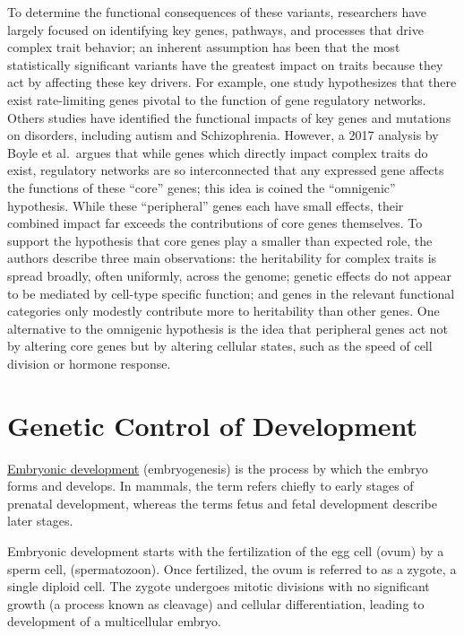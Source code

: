To determine the functional consequences of these variants, researchers have largely focused on identifying key genes, pathways, and processes that drive complex trait behavior; an inherent assumption has been that the most statistically significant variants have the greatest impact on traits because they act by affecting these key drivers. For example, one study hypothesizes that there exist rate-limiting genes pivotal to the function of gene regulatory networks. Others studies have identified the functional impacts of key genes and mutations on disorders, including autism and Schizophrenia. However, a 2017 analysis by Boyle et al.~argues that while genes which directly impact complex traits do exist, regulatory networks are so interconnected that any expressed gene affects the functions of these ``core'' genes; this idea is coined the ``omnigenic'' hypothesis. While these ``peripheral'' genes each have small effects, their combined impact far exceeds the contributions of core genes themselves. To support the hypothesis that core genes play a smaller than expected role, the authors describe three main observations: the heritability for complex traits is spread broadly, often uniformly, across the genome; genetic effects do not appear to be mediated by cell-type specific function; and genes in the relevant functional categories only modestly contribute more to heritability than other genes. One alternative to the omnigenic hypothesis is the idea that peripheral genes act not by altering core genes but by altering cellular states, such as the speed of cell division or hormone response.

\hypertarget{genetic-control-of-development}{%
\chapter{Genetic Control of Development}\label{genetic-control-of-development}}

\href{https://en.wikipedia.org/wiki/Embryonic_development}{Embryonic development} (embryogenesis) is the process by which the embryo forms and develops. In mammals, the term refers chiefly to early stages of prenatal development, whereas the terms fetus and fetal development describe later stages.

Embryonic development starts with the fertilization of the egg cell (ovum) by a sperm cell, (spermatozoon). Once fertilized, the ovum is referred to as a zygote, a single diploid cell. The zygote undergoes mitotic divisions with no significant growth (a process known as cleavage) and cellular differentiation, leading to development of a multicellular embryo.


